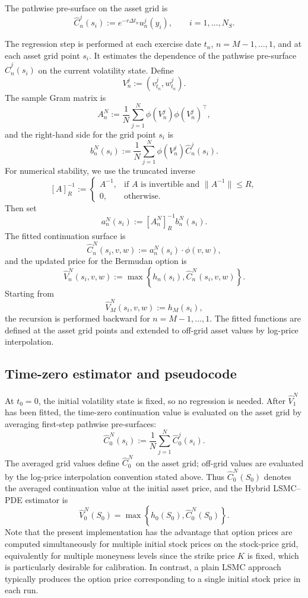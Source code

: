 \documentclass[pdflatex,sn-mathphys-num]{sn-jnl}
\theoremstyle{thmstyleone}%
\theoremstyle{thmstylethree}%
\theoremstyle{thmstyletwo}%
\begin{document}
The pathwise pre-surface on the asset grid is
$$
\widehat C_n^j(s_i)
:=
e^{-r\Delta t_n}u_n^j(y_i),
\qquad i=1,\ldots,N_S.
$$

The regression step is performed at each exercise date $t_n$,
$n=M-1,\ldots,1$, and at each asset grid point $s_i$. It estimates the
dependence of the pathwise pre-surface $\widehat C_n^j(s_i)$ on the current
volatility state. Define
$$
V_n^j:=(v_{t_n}^j,w_{t_n}^j).
$$
The sample Gram matrix is
$$
A_n^N
:=
\frac1N\sum_{j=1}^N
\phi(V_n^j)\phi(V_n^j)^\top,
$$
and the right-hand side for the grid point $s_i$ is
$$
b_n^N(s_i)
:=
\frac1N\sum_{j=1}^N
\phi(V_n^j)\widehat C_n^j(s_i).
$$
For numerical stability, we use the truncated inverse
\begin{equation}\label{eq:estimated_coeff}
[A]^{-1}_R
:=
\begin{cases}
A^{-1}, & \text{if $A$ is invertible and }\|A^{-1}\|\le R,\\
0,  & \text{otherwise.}
\end{cases}
\end{equation}
Then set
\begin{equation}
a_n^N(s_i):=[A_n^N]^{-1}_R b_n^N(s_i).
\label{eq:lsq}
\end{equation}
The fitted continuation surface is
$$
\widehat C_n^N(s_i,v,w)
:=
a_n^N(s_i)\cdot\phi(v,w),
$$
and the updated price for the Bermudan option is
$$
\widehat V_n^N(s_i,v,w)
:=
\max\left\{
h_n(s_i),
\widehat C_n^N(s_i,v,w)
\right\}.
$$
Starting from
$$
\widehat V_M^N(s_i,v,w):=h_M(s_i),
$$
the recursion is performed backward for $n=M-1,\ldots,1$. The fitted functions
are defined at the asset grid points and extended to off-grid asset values by
log-price interpolation.

\subsection{Time-zero estimator and pseudocode}
At $t_0=0$, the initial volatility state is fixed, so no regression is needed. After $\widehat V_1^N$ has been fitted, the time-zero
continuation value is evaluated on the asset grid by averaging first-step
pathwise pre-surfaces:
$$
\widehat C_0^N(s_i)
:=
\frac1N
\sum_{j=1}^{N}
\widehat C_0^j(s_i).
$$
The averaged grid values define $\widehat C_0^N$ on the asset grid; off-grid
values are evaluated by the log-price interpolation convention stated above.
Thus $\widehat C_0^N(S_0)$ denotes the averaged continuation value at the
initial asset price, and the Hybrid LSMC--PDE estimator is
\begin{equation}\label{eq:hybrid_est}
\widehat V_0^N(S_0)
=
\max\left\{
h_0(S_0),
\widehat C_0^N(S_0)
\right\}.
\end{equation}
Note that the present implementation has the advantage that option prices are computed simultaneously for multiple initial stock prices on the stock-price grid, equivalently for multiple moneyness levels since the strike price $K$ is fixed, which is particularly desirable for calibration. In contrast, a plain LSMC approach typically produces the option price corresponding to a single initial stock price in each run.
\end{document}

